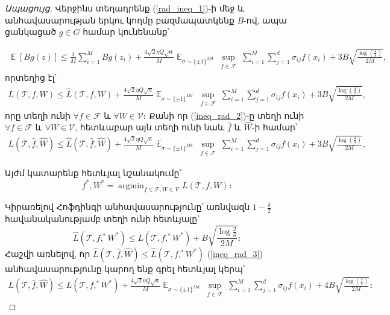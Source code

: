 \documentclass[12pt]{article}
\DeclareMathOperator*{\argmin}{argmin}
\DeclareMathOperator*{\E}{\mathbb{E}}
\begin{document}
\begin{proof}[Ապացույց]
Վերջինս տեղադրենք (\ref{rad_ineq_1})-ի մեջ և անհավասարության երկու կողմը բազմապատկենք $B$-ով, ապա ցանկացած $g \in G$ համար կունենանք՝

\begin{align*}
\E[Bg(z)] \leq \frac{1}{M}\sum_{i=1}^MBg(z_i) + \frac{4\sqrt{2} \eta Q\sqrt{n}}{M} \E_{\sigma \sim \{\pm1\}^{Md}} \sup_{\substack{ f  \in \mathcal{F}  }}\sum_{i=1}^M \sum_{j=1}^d \sigma_{ij}f(x_i)+    3B\sqrt{\frac{\log \left( \frac{4}{\delta} \right)}{2M}},
\end{align*}
որտեղից էլ՝
\begin{align}
\label{ineq_rad_2}
L(\mathcal{T}, f, W) \leq \hat{L}(\mathcal{T}, f, W) + \frac{4\sqrt{2} \eta Q\sqrt{n}}{M} \E_{\sigma \sim \{\pm1\}^{Md}} \sup_{\substack{ f  \in \mathcal{F}  }}\sum_{i=1}^M \sum_{j=1}^d \sigma_{ij}f(x_i)+    3B\sqrt{\frac{\log \left( \frac{4}{\delta} \right)}{2M}},
\end{align}
որը տեղի ունի $\forall f \in \mathcal{ F}$ և $\forall W \in \mathcal{V}$։ Քանի որ  (\ref{ineq_rad_2})-ը տեղի ունի $\forall f \in \mathcal{ F}$ և $\forall W \in \mathcal{V}$, հետևաբար այն տեղի ունի նաև $\hat{f}$ և $\hat{W}$-ի համար՝
\begin{align}
\label{ineq_rad_3}
L(\mathcal{T}, \hat{f}, \hat{W}) \leq \hat{L}(\mathcal{T}, \hat{f}, \hat{W}) + \frac{4\sqrt{2} \eta Q\sqrt{n}}{M} \E_{\sigma \sim \{\pm1\}^{Md}} \sup_{\substack{ f  \in \mathcal{F}  }}\sum_{i=1}^M \sum_{j=1}^d \sigma_{ij}f(x_i)+    3B\sqrt{\frac{\log \left( \frac{4}{\delta} \right)}{2M}},
\end{align}

Այժմ կատարենք հետևյալ նշանակումը՝ $$f^*, W^* = \argmin_{f \in \mathcal{F}, W \in \mathcal{V}}L(\mathcal{T}, f, W)։$$ \par Կիրառելով Հոֆդինգի անհավասարությունը՝ առնվազն $1- \frac{\delta}{2}$ հավանականությամբ տեղի ունի հետևյալը՝
$$\hat{L}(\mathcal{T}, f,^* W^*) \leq L(\mathcal{T}, f,^* W^*) + B\sqrt{\frac{\log\frac{2}{\delta}}{2M}}։$$
Հաշվի առնելով, որ $\hat{L}(\mathcal{T}, \hat{f}, \hat{W})  \leq \hat{L}(\mathcal{T}, f,^* W^*) $  (\ref{ineq_rad_3}) անհավասարությունը կարող ենք գրել հետևյալ կերպ՝
\begin{align}
\label{ineq_rad_4}
L(\mathcal{T}, \hat{f}, \hat{W}) \leq  L(\mathcal{T}, f,^* W^*) + \frac{4\sqrt{2} \eta Q\sqrt{n}}{M} \E_{\sigma \sim \{\pm1\}^{Md}} \sup_{\substack{ f  \in \mathcal{F}  }}\sum_{i=1}^M \sum_{j=1}^d \sigma_{ij}f(x_i)+    4B\sqrt{\frac{\log \left( \frac{4}{\delta} \right)}{2M}}։
\end{align}


\end{proof}
\end{document}
